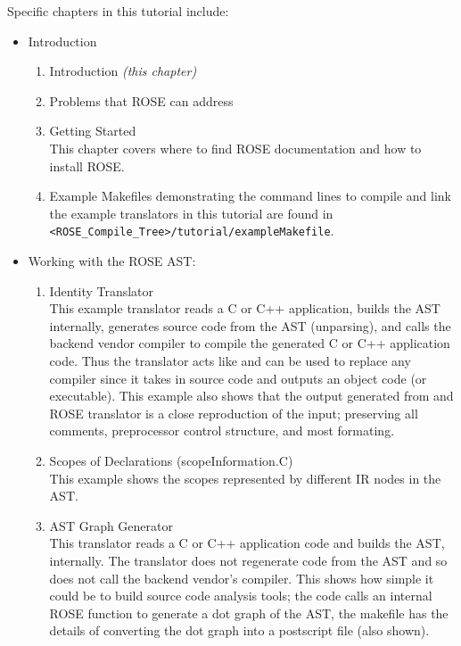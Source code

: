Specific chapters in this tutorial include: 

\begin{itemize}
\item Introduction 

\begin{enumerate}
     \item Introduction {\em (this chapter)}
     \item Problems that ROSE can address
     \item Getting Started \\
           This chapter covers where to find ROSE documentation and how to install ROSE.

     \item Example Makefiles demonstrating the command lines to compile and link the 
           example translators in this tutorial are found in 
           {\tt <ROSE\_Compile\_Tree>/tutorial/exampleMakefile}.

\end{enumerate}

\item Working with the ROSE AST:
\begin{enumerate}
     \item Identity Translator \\
           This example translator reads a C or C++ application, builds the AST
           internally, generates source code from the AST (unparsing), and calls
           the backend vendor compiler to compile the generated C or C++ application 
           code.  Thus the translator acts like and can be used to replace any compiler 
           since it takes in source code and outputs an object code (or executable).
           This example also shows that the output generated from and ROSE translator is
           a close reproduction of the input; preserving all comments, preprocessor
           control structure, and most formating.

     \item Scopes of Declarations (scopeInformation.C) \\
           This example shows the scopes represented by different IR nodes in the AST.


     \item AST Graph Generator \\
           This translator reads a C or C++ application code and builds the AST, internally.
           The translator does not regenerate code from the AST and so does not
           call the backend vendor's compiler. This shows how simple it could be
           to build source code analysis tools; the code calls an internal ROSE function
           to generate a dot graph of the AST, the makefile has the details of converting
           the dot graph into a postscript file (also shown).


\end{enumerate}
\end{itemize}
